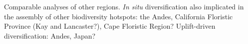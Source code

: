 Comparable analyses of other regions. \textit{In situ} diversification also implicated in the assembly of other biodiversity hotspots: the Andes, California Floristic Province (Kay and Lancaster?), Cape Floristic Region? Uplift-driven diversification: Andes, Japan? %
